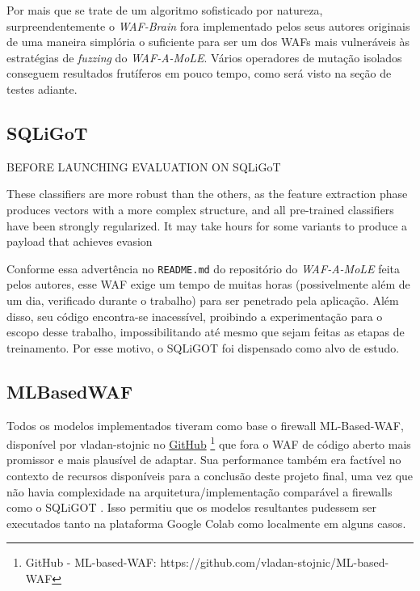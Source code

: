 Por mais que se trate de um algoritmo sofisticado por natureza, surpreendentemente o \textit{WAF-Brain} fora implementado pelos seus autores originais de uma maneira simplória o suficiente para ser um dos WAFs mais vulneráveis às estratégias de \textit{fuzzing} do \textit{WAF-A-MoLE}. Vários operadores de mutação isolados conseguem resultados frutíferos em pouco tempo, como será visto na seção de testes adiante.

\subsection{SQLiGoT}

\begin{citacao}[english]
BEFORE LAUNCHING EVALUATION ON SQLiGoT

These classifiers are more robust than the others, as the feature extraction phase produces vectors with a more complex structure, and all pre-trained classifiers have been strongly regularized. It may take hours for some variants to produce a payload that achieves evasion
\end{citacao}
\bigskip

Conforme essa advertência no \verb+README.md+ do repositório do \textit{WAF-A-MoLE} feita pelos autores, esse WAF exige um tempo de muitas horas (possivelmente além de um dia, verificado durante o trabalho) para ser penetrado pela aplicação. Além disso, seu código encontra-se inacessível, proibindo a experimentação para o escopo desse trabalho, impossibilitando até mesmo que sejam feitas as etapas de treinamento. Por esse motivo, o SQLiGOT \cite{kar2016sqligot} foi dispensado como alvo de estudo.

\subsection{MLBasedWAF}
Todos os modelos implementados tiveram como base o firewall ML-Based-WAF, disponível por vladan-stojnic no \href{https://github.com/vladan-stojnic/ML-based-WAF}{GitHub} \footnote{GitHub - ML-based-WAF: https://github.com/vladan-stojnic/ML-based-WAF} \cite{ml_based_waf} que fora o WAF de código aberto mais promissor e mais plausível de adaptar. Sua performance também era factível no contexto de recursos disponíveis para a conclusão deste projeto final, uma vez que não havia complexidade na arquitetura/implementação comparável a firewalls como o SQLiGOT \cite{kar2016sqligot}. Isso permitiu que os modelos resultantes pudessem ser executados tanto na plataforma Google Colab como localmente em alguns casos.

